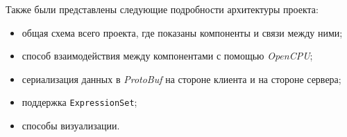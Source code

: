 Также были представлены следующие подробности архитектуры проекта:\begin{itemize}
\item общая схема всего проекта, где показаны компоненты и связи между ними;
\item способ взаимодействия между компонентами с помощью \emph{OpenCPU};
\item сериализация данных в \emph{ProtoBuf} на стороне клиента и на стороне сервера;
\item поддержка \texttt{ExpressionSet};
\item способы визуализации.
\end{itemize}
